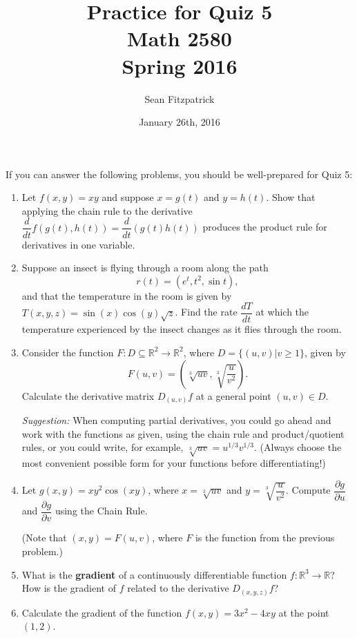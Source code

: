 \documentclass[letterpaper,12pt]{article}
\title{Practice for Quiz 5\\Math 2580\\Spring 2016}
\author{Sean Fitzpatrick}
\date{January 26th, 2016}
\newcommand{\R}{\mathbb{R}}
\begin{document}
 \maketitle

If you can answer the following problems, you should be well-prepared for Quiz 5:



\begin{enumerate}
 \item Let $f(x,y)=xy$ and suppose $x=g(t)$ and $y=h(t)$. Show that applying the chain rule to the derivative $
\dfrac{d}{dt}f(g(t),h(t))= \dfrac{d}{dt}(g(t)h(t))$ produces the product rule for derivatives in one variable.
 \item Suppose an insect is flying through a room along the path
 \[
 r(t) = (e^t, t^2, \sin t),
 \]
 and that the temperature in the room is given by $T(x,y,z) = \sin(x)\cos(y)\sqrt{z}$. Find the rate $\dfrac{dT}{dt}$ at which the temperature experienced by the insect changes as it flies through the room.
 \item Consider the function $F:D\subseteq \R^2\to\R^2$, where $D=\{(u,v)|v\geq 1\}$, given by
 \[
 F(u,v) = \left(\sqrt[3]{uv},\sqrt[3]{\frac{u}{v^2}}\right).
 \]
 Calculate the derivative matrix $D_{(u,v)}f$ at a general point $(u,v)\in D$.
 
 {\em Suggestion:} When computing partial derivatives, you could go ahead and work with the functions as given, using the chain rule and product/quotient rules, or you could write, for example, $\sqrt[3]{uv} = u^{1/3}v^{1/3}$. (Always choose the most convenient possible form for your functions before differentiating!)
 
 \item Let $g(x,y) = xy^2\cos(xy)$, where $x=\sqrt[3]{uv}$ and $y=\sqrt[3]{\dfrac{u}{v^2}}$. Compute $\dfrac{\partial g}{\partial u}$ and $\dfrac{\partial g}{\partial v}$ using the Chain Rule.
 
 (Note that $(x,y)=F(u,v)$, where $F$ is the function from the previous problem.)
 
 \item What is the {\bf gradient} of a continuously differentiable function $f:\R^3\to\R$? How is the gradient of $f$ related to the derivative $D_{(x,y,z)}f$?
 
 \item Calculate the gradient of the function $f(x,y)=3x^2-4xy$ at the point $(1,2)$.
\end{enumerate}
\end{document}
